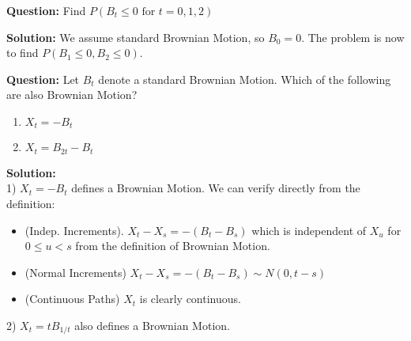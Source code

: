 \documentclass{article}
\begin{document}
\vspace{2mm}

\begin{tcolorbox}[colframe=black,colback=gray!5,boxrule=0.5pt]
\textbf{Question:} Find $P(B_t\leq0\text{ for } t=0,1,2)$ \cite{Fima}
\end{tcolorbox}
\textbf{Solution:} We assume standard Brownian Motion, so $B_0=0$. The problem is now to find $P(B_1\leq0, B_2\leq0)$.


\vspace{2mm}

\begin{tcolorbox}[colframe=black,colback=gray!5,boxrule=0.5pt]
\textbf{Question:} Let $B_t$ denote a standard Brownian Motion. Which of the following are also Brownian Motion? \cite{Fima}
\begin{enumerate}
    \item $X_t = -B_t$
    \item $X_t = B_{2t} - B_t$
\end{enumerate} 
\end{tcolorbox}

\textbf{Solution:}\\
1) $X_t = -B_t$ defines a Brownian Motion. We can verify directly from the definition: 
\begin{itemize}
    \item (Indep. Increments). $X_t - X_s = -(B_t - B_s)$ which is independent of $X_u$ for $0\leq u <s$ from the definition of Brownian Motion. 
    \item (Normal Increments) $X_t - X_s = -(B_t - B_s) \sim N(0, t-s)$
    \item (Continuous Paths) $X_t$ is clearly continuous.
\end{itemize}
2) $X_t = t B_{1/t}$ also defines a Brownian Motion.

\vspace{2mm}
\end{document}
